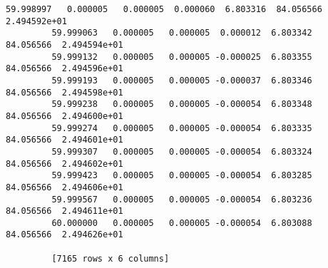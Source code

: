 \documentclass[11pt]{article}
\begin{document}
\begin{Verbatim}[commandchars=\\\{\}]
         59.998997   0.000005   0.000005  0.000060  6.803316  84.056566  2.494592e+01
         59.999063   0.000005   0.000005  0.000012  6.803342  84.056566  2.494594e+01
         59.999132   0.000005   0.000005 -0.000025  6.803355  84.056566  2.494596e+01
         59.999193   0.000005   0.000005 -0.000037  6.803346  84.056566  2.494598e+01
         59.999238   0.000005   0.000005 -0.000054  6.803348  84.056566  2.494600e+01
         59.999274   0.000005   0.000005 -0.000054  6.803335  84.056566  2.494601e+01
         59.999307   0.000005   0.000005 -0.000054  6.803324  84.056566  2.494602e+01
         59.999423   0.000005   0.000005 -0.000054  6.803285  84.056566  2.494606e+01
         59.999567   0.000005   0.000005 -0.000054  6.803236  84.056566  2.494611e+01
         60.000000   0.000005   0.000005 -0.000054  6.803088  84.056566  2.494626e+01
         
         [7165 rows x 6 columns]
\end{Verbatim}
            

    
    
    
    
\end{document}
